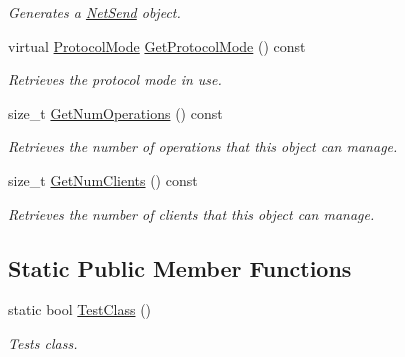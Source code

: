 \begin{DoxyCompactItemize}
\begin{DoxyCompactList}\small\item\em Generates a \hyperlink{class_net_send}{NetSend} object. \item\end{DoxyCompactList}\item 
virtual \hyperlink{class_net_mode_a43cfa55ee6a4db66a8d7d6c27f766964}{ProtocolMode} \hyperlink{class_net_mode_udp_catch_all_a84cd8b30de444fa8dbd699fdae416a84}{GetProtocolMode} () const 
\begin{DoxyCompactList}\small\item\em Retrieves the protocol mode in use. \item\end{DoxyCompactList}\item 
size\_\-t \hyperlink{class_net_mode_udp_catch_all_a44f2ced63d3d36ba590edb7cb60c0532}{GetNumOperations} () const 
\begin{DoxyCompactList}\small\item\em Retrieves the number of operations that this object can manage. \item\end{DoxyCompactList}\item 
size\_\-t \hyperlink{class_net_mode_udp_catch_all_a5726dba2839ba6dccb9a384bf91ae0dc}{GetNumClients} () const 
\begin{DoxyCompactList}\small\item\em Retrieves the number of clients that this object can manage. \item\end{DoxyCompactList}\end{DoxyCompactItemize}
\subsection*{Static Public Member Functions}
\begin{DoxyCompactItemize}
\item 
static bool \hyperlink{class_net_mode_udp_catch_all_abf7feda18651d7fc4638da1a75841ad9}{TestClass} ()
\begin{DoxyCompactList}\small\item\em Tests class. \item\end{DoxyCompactList}\end{DoxyCompactItemize}
